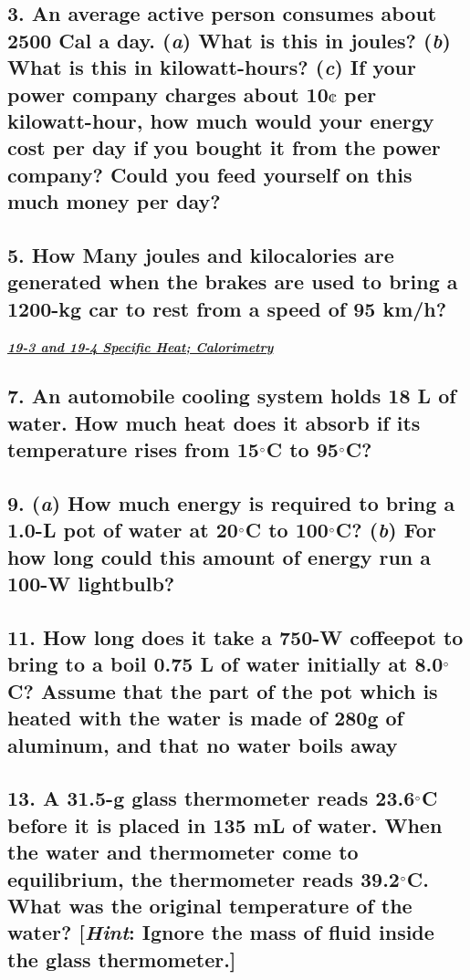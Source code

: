 \documentclass{article}
\begin{document}
\subsection*{3. An average active person consumes about 2500 Cal a day. (\textit a) What is this in joules? (\textit b) What is this in kilowatt-hours? (\textit c) If your power company charges about 10$\cent$ per kilowatt-hour, how much would your energy cost per day if you bought it from the power company? Could you feed yourself on this much money per day?}

\subsection*{5. How Many joules and kilocalories are generated when the brakes are used to bring a 1200-kg car to rest from a speed of 95 km/h?}
\vspace{1em}
\large{\textbf{\textit{\underline{19-3 and 19-4 Specific Heat; Calorimetry}}}} \\

\subsection*{7. An automobile cooling system holds 18 L of water. How much heat does it absorb if its temperature rises from 15$\degree$C to 95$\degree$C?}

\subsection*{9. (\textit a) How much energy is required to bring a 1.0-L pot of water at 20$\degree$C to 100$\degree$C? (\textit b) For how long could this amount of energy run a 100-W lightbulb?}

\subsection*{11. How long does it take a 750-W coffeepot to bring to a boil 0.75 L of water initially at 8.0$\degree$C? Assume that the part of the pot which is heated with the water is made of 280g of aluminum, and that no water boils away}

\subsection*{13. A 31.5-g glass thermometer reads 23.6$\degree$C before it is placed in 135 mL of water. When the water and thermometer come to equilibrium, the thermometer reads 39.2$\degree$C. What was the original temperature of the water? [\textit{Hint}: Ignore the mass of fluid inside the glass thermometer.]}
\end{document}
